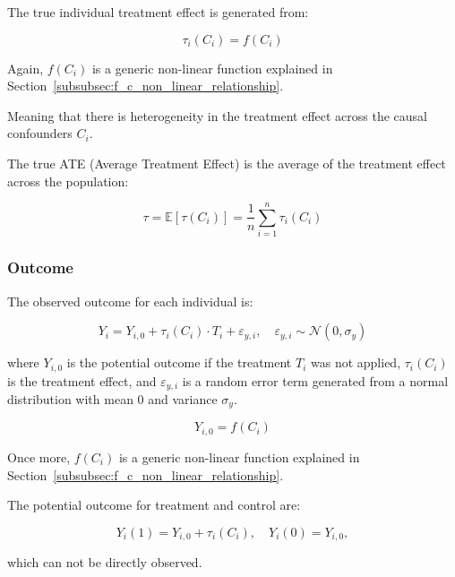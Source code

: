 \documentclass{article}
\numberwithin{equation}{section}
\begin{document}
The true individual treatment effect is generated from:

\begin{equation}
    \tau_i(C_i) = f(C_i)
    \label{eq:treatment_effect}
\end{equation}

Again, $f(C_i)$ is a generic non-linear function explained in Section~\ref{subsubsec:f_c_non_linear_relationship}.

Meaning that there is heterogeneity in the treatment effect across the causal confounders $C_i$.

The true ATE (Average Treatment Effect) is the average of the treatment effect across the population:

\begin{equation}
    \tau = \mathbb{E}[\tau(C_i)] = \frac{1}{n} \sum_{i=1}^{n} \tau_i(C_i)
\end{equation}

\subsubsection{Outcome}

The observed outcome for each individual is:

\begin{equation}
    Y_i = Y_{i, 0} + \tau_i(C_i) \cdot T_i + \varepsilon_{y, i}, \quad \varepsilon_{y, i} \sim \mathcal{N}(0, \sigma_{y})
    \label{eq:observed_outcome}
\end{equation}

where $Y_{i, 0}$ is the potential outcome if the treatment $T_i$ was not applied, $\tau_i(C_i)$ is the treatment effect, and $\varepsilon_{y, i}$ is a random error term generated from a normal distribution with mean 0 and variance $\sigma_{y}$.

\begin{equation}
    Y_{i, 0} = f(C_i)
    \label{eq:potential_outcome_no_treatment}
\end{equation}

Once more, $f(C_i)$ is a generic non-linear function explained in Section~\ref{subsubsec:f_c_non_linear_relationship}.

The potential outcome for treatment and control are:

\begin{equation}
    Y_i(1) = Y_{i, 0} + \tau_i(C_i), \quad Y_i(0) = Y_{i, 0},
    \label{eq:potential_outcomes}
\end{equation}

which can not be directly observed.
\end{document}
